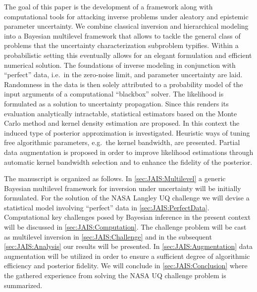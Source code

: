 \par %
The goal of this paper is the development of a framework along with computational tools for attacking inverse problems under aleatory and epistemic parameter uncertainty.
We combine classical inversion and hierarchical modeling into a Bayesian multilevel framework that allows to tackle the general class of problems that the uncertainty characterization subproblem typifies.
Within a probabilistic setting this eventually allows for an elegant formulation and efficient numerical solution.
The foundations of inverse modeling in conjunction with ``perfect'' data, i.e.\ in the zero-noise limit, and parameter uncertainty are laid.
Randomness in the data is then solely attributed to a probability model of the input arguments of a computational ``blackbox'' solver.
The likelihood is formulated as a solution to uncertainty propagation.
Since this renders its evaluation analytically intractable, statistical estimators based on the Monte Carlo method and kernel density estimation are proposed.
In this context the induced type of posterior approximation is investigated.
Heuristic ways of tuning free algorithmic parameters, e.g.\ the kernel bandwidth, are presented.
Partial data augmentation is proposed in order to improve likelihood estimations through automatic kernel bandwidth selection and to enhance the fidelity of the posterior.
\par %
The manuscript is organized as follows.
In \cref{sec:JAIS:Multilevel} a generic Bayesian multilevel framework for inversion under uncertainty will be initially formulated.
For the solution of the NASA Langley UQ challenge we will devise a statistical model involving ``perfect'' data in \cref{sec:JAIS:PerfectData}.
Computational key challenges posed by Bayesian inference in the present context will be discussed in \cref{sec:JAIS:Computation}.
The challenge problem will be cast as multilevel inversion in \cref{sec:JAIS:Challenge} and in the subsequent \cref{sec:JAIS:Analysis} our results will be presented.
In \cref{sec:JAIS:Augmentation} data augmentation will be utilized in order to ensure a sufficient degree of algorithmic efficiency and posterior fidelity.
We will conclude in \cref{sec:JAIS:Conclusion} where the gathered experience from solving the NASA UQ challenge problem is summarized.